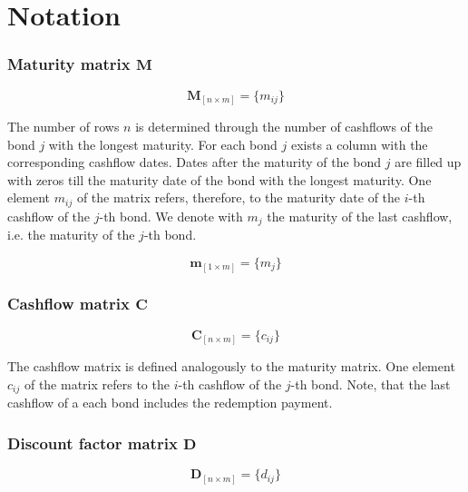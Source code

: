
\section{Notation}
\label{sec:notation}

\subsubsection*{Maturity matrix $\bm{M}$}

\begin{equation}\label{maturitym}
\bm{M}_{\left[n\times m\right]}= \{m_{ij}\}
\end{equation}

The number of rows $n$ is determined through the number of cashflows of the bond $j$ with the longest maturity. For each bond $j$ exists a column with the corresponding cashflow dates. Dates after the maturity of the bond $j$ are filled up with zeros till the maturity date of the bond with the longest maturity. One element $m_{ij}$ of the matrix  refers, therefore, to the maturity date of  the $i$-th cashflow of the $j$-th bond. We denote with $m_j$ the maturity of the last cashflow, i.e. the maturity of the $j$-th bond.

\begin{equation}\label{weights}
    \bm{m}_{\left[1\times m\right]}= \{m_j\}
\end{equation}

\subsubsection*{Cashflow matrix $\bm{C}$}

 \begin{equation}\label{cashflowm}
\bm{C}_{\left[n\times m\right]}= \{c_{ij}\}
\end{equation}

 The cashflow matrix is defined analogously to the maturity matrix.  One element $c_{ij}$  of the matrix refers to the $i$-th cashflow of the $j$-th bond. Note, that the last cashflow of a each bond includes the redemption payment.

\subsubsection*{Discount factor matrix $\bm{D}$}

 \begin{equation}\label{discountm}
\bm{D}_{\left[n\times m\right]}= \{d_{ij}\}
\end{equation}


